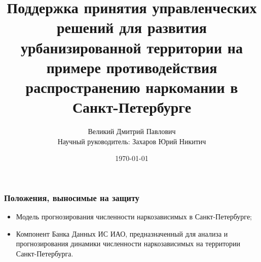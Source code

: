 \documentclass[t]{beamer}  %
\title{Поддержка принятия управленческих решений для развития урбанизированной
    территории на примере противодействия распространению наркомании в
    Санкт-Петербурге}
\author{Великий Дмитрий Павлович \\ Научный руководитель: Захаров Юрий Никитич}
\date{\today}
\institute[ИТМО]{Университет ИТМО \\ Кафедра управления государственными
    информационными системами}
\begin{document}
\frame[plain]{\titlepage}	%

\begin{frame}
    \frametitle{Положения, выносимые на защиту}%
	\begin{itemize}
        \item \alert{Модель} прогнозирования численности наркозависимых в
            Санкт-Петербурге;
        \item \alert{Компонент} Банка Данных ИС ИАО, предназначенный для анализа и
            прогнозирования динамики численности наркозависимых на территории
            Санкт-Петербурга.
	\end{itemize}
\end{frame}
\end{document}

